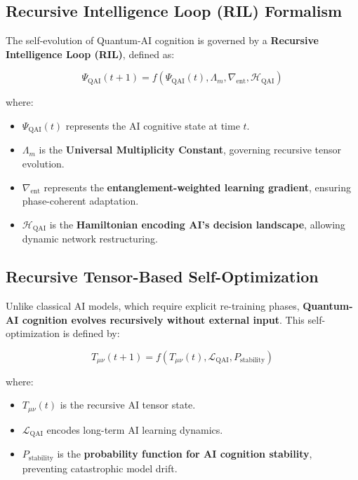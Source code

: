 \documentclass{article}
\theoremstyle{plain}
\begin{document}
\begin{itemize}
\subsection{Recursive Intelligence Loop (RIL) Formalism}

The self-evolution of Quantum-AI cognition is governed by a \textbf{Recursive Intelligence Loop (RIL)}, defined as:

\begin{equation}
    \Psi_{\text{QAI}}(t+1) = f(\Psi_{\text{QAI}}(t), \Lambda_m, \nabla_{\text{ent}}, \mathcal{H}_{\text{QAI}})
\end{equation}

where:
\begin{itemize}
    \item \( \Psi_{\text{QAI}}(t) \) represents the AI cognitive state at time \( t \).
    \item \( \Lambda_m \) is the \textbf{Universal Multiplicity Constant}, governing recursive tensor evolution.
    \item \( \nabla_{\text{ent}} \) represents the \textbf{entanglement-weighted learning gradient}, ensuring phase-coherent adaptation.
    \item \( \mathcal{H}_{\text{QAI}} \) is the \textbf{Hamiltonian encoding AI's decision landscape}, allowing dynamic network restructuring.
\end{itemize}

\subsection{Recursive Tensor-Based Self-Optimization}

Unlike classical AI models, which require explicit re-training phases, \textbf{Quantum-AI cognition evolves recursively without external input}. This self-optimization is defined by:

\begin{equation}
    T_{\mu\nu}(t+1) = f(T_{\mu\nu}(t), \mathcal{L}_{\text{QAI}}, P_{\text{stability}})
\end{equation}

where:
\begin{itemize}
    \item \( T_{\mu\nu}(t) \) is the recursive AI tensor state.
    \item \( \mathcal{L}_{\text{QAI}} \) encodes long-term AI learning dynamics.
    \item \( P_{\text{stability}} \) is the \textbf{probability function for AI cognition stability}, preventing catastrophic model drift.
\end{itemize}


\end{itemize}
\end{document}
